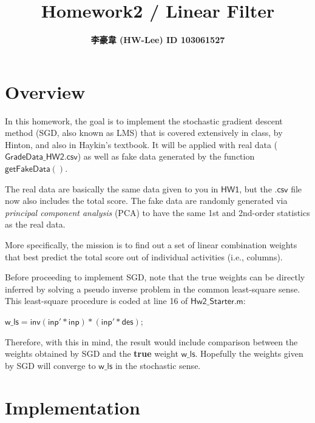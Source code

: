 \documentclass[12pt]{article}
\title{\textbf{Homework2 / Linear Filter}}
\author{\textbf{李豪韋 (HW-Lee) ID 103061527}}
\date{}
\begin{document}
\vspace*{-60pt}
    {\let\newpage\relax\maketitle}

\section*{Overview}
\vspace{-20pt}
\noindent\makebox[\linewidth]{\rule{\textwidth}{0.4pt}}
\vspace{5pt}

In this homework, the goal is to implement the stochastic gradient descent method (SGD, also known as LMS) that is covered extensively in class, by Hinton, and also in Haykin’s textbook. It will be applied with real data ($\mathsf{GradeData\_HW2.csv}$) as well as fake data generated by the function $\mathsf{getFakeData()}$.

The real data are basically the same data given to you in $\mathsf{HW1}$, but the $\mathsf{.csv}$ file now also includes the total score. The fake data are randomly generated via {\it principal component analysis} (PCA) to have the same 1st and 2nd-order statistics as the real data.

More specifically, the mission is to find out a set of linear combination weights that best predict the total score out of individual activities (i.e., columns).

Before proceeding to implement SGD, note that the true weights can be directly inferred by solving a pseudo inverse problem in the common least-square sense. This least-square procedure is coded at line 16 of $\mathsf{Hw2\_Starter.m}$:
\begin{center}
	$\mathsf{w\_ls = inv(inp'*inp)*(inp'*des);}$
\end{center}

Therefore, with this in mind, the result would include comparison between the weights obtained by SGD and the {\bf true} weight $\mathsf{w\_ls}$. Hopefully the weights given by SGD will converge to $\mathsf{w\_ls}$ in the stochastic sense.

\section*{Implementation}
\vspace{-20pt}
\noindent\makebox[\linewidth]{\rule{\textwidth}{0.4pt}}
\end{document}
